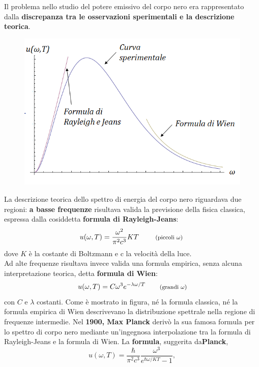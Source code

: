 \documentclass[a4paper,12pt,oneside]{book}
\begin{document}
Il problema nello studio del potere emissivo del corpo nero era rappresentato dalla \textbf{discrepanza tra le osservazioni sperimentali e la descrizione teorica}.\\
\begin{figure}[!htbp]
\begin{center}
\includegraphics[width=.7\textwidth]{immagini/cap_1/fig_1_2.png}
\end{center}
\end{figure}
La descrizione teorica dello spettro di energia del corpo nero riguardava due regioni: \textbf{a basse frequenze} risultava valida la previsione della fisica classica, espressa dalla cosiddetta \textbf{formula di Rayleigh-Jeans}:
\begin{equation}
u(\omega , T)= \frac{\omega ^2}{\pi ^2 c^3}KT \qquad \textrm{ \footnotesize{(piccoli $\omega$)} }
\end{equation}
dove $K$ è la costante di Boltzmann e c la velocità della luce.\\
Ad alte frequenze risultava invece valida una formula empirica, senza alcuna interpretazione teorica, detta \textbf{formula di Wien}:
\begin{equation}
u(\omega ,T)= C \omega ^3 e^{-\lambda \omega /T} \qquad \textrm{\footnotesize{(grandi $\omega$)}}
\end{equation}
con $C$ e $\lambda$ costanti. Come è mostrato in figura, né la formula classica, né  la formula empirica di Wien descrivevano la distribuzione spettrale nella regione di frequenze intermedie.
Nel \textbf{1900, Max Planck} derivò la sua famosa formula per lo spettro di corpo nero mediante un'ingegnosa interpolazione tra la formula di Rayleigh-Jeans e la formula di Wien. La \textbf{formula}, suggerita da\textbf{Planck},
\begin{equation}
u(\omega, T) = \frac{\hbar}{\pi ^2 c^3}\frac{\omega ^3}{e^{\hbar \omega / KT}-1},
\end{equation}
\end{document}
